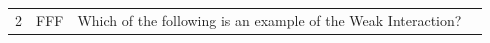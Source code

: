 \documentclass[10pt]{article}
\begin{document}
\begin{tiny}
\begin{longtable}{|r|p{0.375in}|p{1.275in}|p{3.5in}|}
2  &          FFF &                                                                                                                                                                                                                    Which of the following is an example of the Weak Interaction? &                                                                                                                                                                                                                                                                                                                                                                                                                                                                                                                                                                                                                                                                                                                                                                                                                                                                                                                                                                                                                                                                                                                                                                                                                                                                                                                                                                                                                                                                                                                                                                                                                                                                                                                                                                                                                                                                                                                                                                                                                                                                                                                                                                                                                                                                                                                                                                                                                                                                                                                                                                                                                                                                                                                                                                                                                                                                                                                                                                                                                                                                                               
\end{longtable}
\end{tiny}
\end{document}
